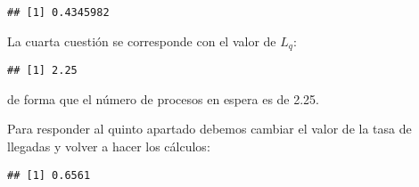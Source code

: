 \documentclass[
]{book}
\newenvironment{Shaded}{\begin{snugshade}}{\end{snugshade}}
\newcommand{\AttributeTok}[1]{\textcolor[rgb]{0.77,0.63,0.00}{#1}}
\newcommand{\CommentTok}[1]{\textcolor[rgb]{0.56,0.35,0.01}{\textit{#1}}}
\newcommand{\DecValTok}[1]{\textcolor[rgb]{0.00,0.00,0.81}{#1}}
\newcommand{\FunctionTok}[1]{\textcolor[rgb]{0.00,0.00,0.00}{#1}}
\newcommand{\NormalTok}[1]{#1}
\newcommand{\OtherTok}[1]{\textcolor[rgb]{0.56,0.35,0.01}{#1}}
\newcommand{\SpecialCharTok}[1]{\textcolor[rgb]{0.00,0.00,0.00}{#1}}
\theoremstyle{definition}
\theoremstyle{definition}
\theoremstyle{definition}
\theoremstyle{definition}
\theoremstyle{remark}
\begin{document}
\begin{Shaded}
\end{Shaded}

\begin{verbatim}
## [1] 0.4345982
\end{verbatim}

La cuarta cuestión se corresponde con el valor de \(L_q\):

\begin{Shaded}
\end{Shaded}

\begin{verbatim}
## [1] 2.25
\end{verbatim}

de forma que el número de procesos en espera es de 2.25.

Para responder al quinto apartado debemos cambiar el valor de la tasa de llegadas y volver a hacer los cálculos:

\begin{Shaded}
\end{Shaded}

\begin{verbatim}
## [1] 0.6561
\end{verbatim}

\begin{Shaded}
\end{Shaded}
\end{document}
